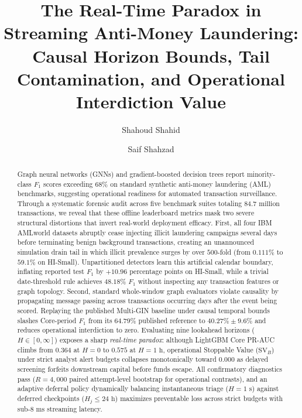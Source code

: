 \documentclass[sigconf,nonacm]{acmart}
\begin{document}
\title{The Real-Time Paradox in Streaming Anti-Money Laundering: Causal Horizon Bounds, Tail Contamination, and Operational Interdiction Value}

\author{Shahoud Shahid}

\author{Saif Shahzad}
\authornotemark[1]

\begin{abstract}
Graph neural networks (GNNs) and gradient-boosted decision trees report minority-class $F_1$ scores exceeding $68\%$ on standard synthetic anti-money laundering (AML) benchmarks, suggesting operational readiness for automated transaction surveillance. Through a systematic forensic audit across five benchmark suites totaling $84.7\text{ million}$ transactions, we reveal that these offline leaderboard metrics mask two severe structural distortions that invert real-world deployment efficacy. First, all four IBM AMLworld datasets abruptly cease injecting illicit laundering campaigns several days before terminating benign background transactions, creating an unannounced simulation drain tail in which illicit prevalence surges by over $500$-fold (from $0.111\%$ to $59.1\%$ on HI-Small). Unpartitioned detectors learn this artificial calendar boundary, inflating reported test $F_1$ by $+10.96$ percentage points on HI-Small, while a trivial date-threshold rule achieves $48.18\%$ $F_1$ without inspecting any transaction features or graph topology. Second, standard whole-window graph evaluators violate causality by propagating message passing across transactions occurring days after the event being scored. Replaying the published Multi-GIN baseline under causal temporal bounds slashes Core-period $F_1$ from its $64.79\%$ published reference to $40.27\% \pm 9.6\%$ and reduces operational interdiction to zero. Evaluating nine lookahead horizons ($H \in [0, \infty]$) exposes a sharp \emph{real-time paradox}: although LightGBM Core PR-AUC climbs from $0.364$ at $H=0$ to $0.575$ at $H=1\text{ h}$, operational Stoppable Value ($\text{SV}_B$) under strict analyst alert budgets collapses monotonically toward $0.000$ as delayed screening forfeits downstream capital before funds escape. All confirmatory diagnostics pass ($R=4{,}000$ paired attempt-level bootstrap for operational contrasts), and an adaptive deferral policy dynamically balancing instantaneous triage ($H = 1\text{ s}$) against deferred checkpoints ($H_j \le 24\text{ h}$) maximizes preventable loss across strict budgets with sub-$8\text{ ms}$ streaming latency.
\end{abstract}
\end{document}
